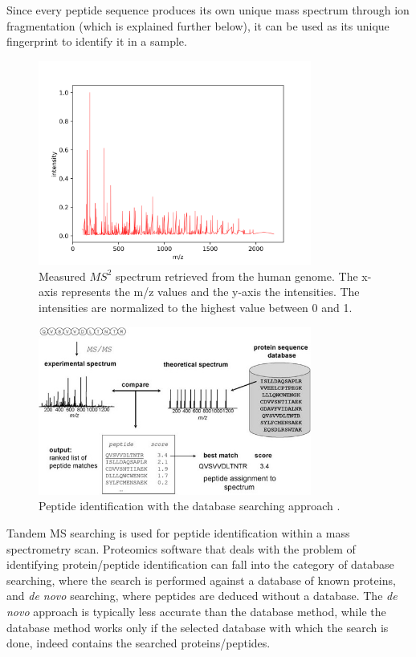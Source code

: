 \documentclass[11pt]{article}
\begin{document}
Since every peptide sequence produces its own unique mass spectrum through ion fragmentation (which is explained further below), it can be used as its unique fingerprint to identify it in a sample. 
\begin{figure}[ht]
\centering
\includegraphics[width=0.8\textwidth]{figs/peptide.png}
\caption{Measured \(MS^2\) spectrum retrieved from the human genome. The x-axis represents the m/z values and the y-axis the intensities. The intensities are normalized to the highest value between 0 and 1.}
\label{fig:peptide-example}
\end{figure}
\begin{figure}[ht]
\centering
\includegraphics[width=0.8\textwidth]{figs/database_search.jpg}
\caption{Peptide identification with the database searching approach \cite{Nesvizhskii2007}.}
\label{fig:database-search}
\end{figure}

Tandem MS searching is used for peptide identification within a mass spectrometry scan. Proteomics software that deals with the problem of identifying protein/peptide identification can fall into the category of database searching, where the search is performed against a database of known proteins, and \textit{de novo} searching, where peptides are deduced without a database. The \textit{de novo} approach is typically less accurate than the database method, while the database method works only if the selected database with which the search is done, indeed contains the searched proteins/peptides.
\end{document}
